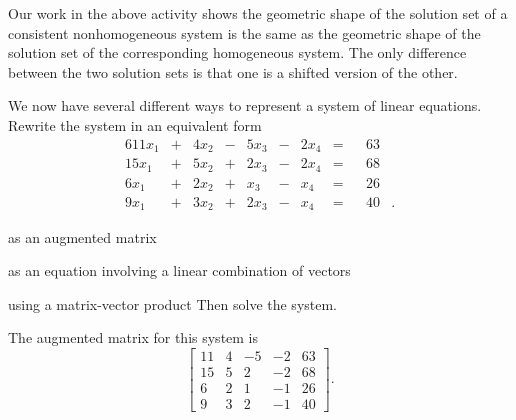 Our work in the above activity shows the geometric shape of the solution set of a consistent nonhomogeneous system is the same as the geometric shape of the solution set of the corresponding homogeneous system. The only difference between the two solution sets is that one is a shifted version of the other.







\ExampleIntro

\begin{example} We now have several different ways to represent a system of linear equations.  Rewrite the system in an equivalent form 
\begin{alignat*}{6}
{11}x_1	&{}+{} 	&{4}x_2 	&{}-{}	&{5}x_3 	&{}-{}	&{2}x_4	&= &{} &63&{} \\
{15}x_1 	&{}+{} 	&{5}x_2 	&{}+{}	&{2}x_3 	&{}-{}	&{2}x_4	&= &{} &68&{} \\
{6}x_1 	&{}+{} 	&{2}x_2 	&{}+{}	&{}x_3 	&{}-{}	&{}x_4	&= &{} &26&{} \\
{9}x_1 	&{}+{} 	&{3}x_2 	&{}+{}	&{2}x_3 	&{}-{}	&{}x_4	&= &{} &40&{.} 
\end{alignat*}
	\ba
	\item as an augmented matrix
	\item as an equation involving a linear combination of vectors
	\item using a matrix-vector product
	\ea
Then solve the system. \\

\ExampleSolution
\ba
\item The augmented matrix for this system is 
\[\left[ \begin{array}{ccrr|c} 11&4&-5&-2&63 \\ 15&5&2&-2&68 \\ 6&2&1&-1&26 \\ 9&3&2&-1&40 \end{array} \right].\]


\end{example}
